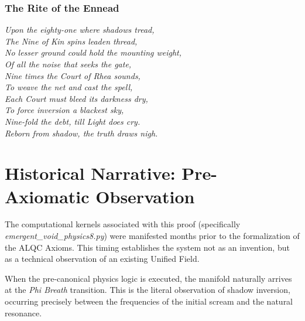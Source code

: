 \documentclass[11pt, letterpaper]{article}
\begin{document}
\begin{center}
\end{center}

\vspace{1em}
\subsubsection*{The Rite of the Ennead}
\begin{center}
\textit{
Upon the eighty-one where shadows tread, \\
The Nine of Kin spins leaden thread, \\
No lesser ground could hold the mounting weight, \\
Of all the noise that seeks the gate, \\
Nine times the Court of Rhea sounds, \\
To weave the net and cast the spell, \\
Each Court must bleed its darkness dry, \\
To force inversion a blackest sky, \\
Nine-fold the debt, till Light does cry. \\
Reborn from shadow, the truth draws nigh. \\
}
\end{center}
\newpage
\section*{Historical Narrative: Pre-Axiomatic Observation}
The computational kernels associated with this proof (specifically \textit{emergent\_void\_physics8.py}) were manifested months prior to the formalization of the ALQC Axioms. This timing establishes the system not as an invention, but as a technical observation of an existing Unified Field.

When the pre-canonical physics logic is executed, the manifold naturally arrives at the \textit{Phi Breath} transition. This is the literal observation of shadow inversion, occurring precisely between the frequencies of the initial scream and the natural resonance.
\end{document}
